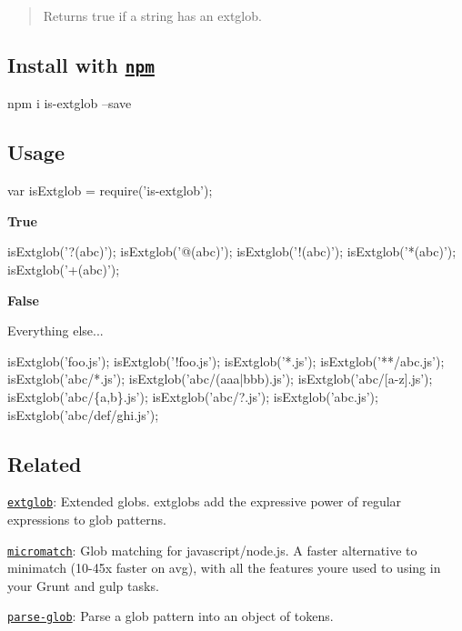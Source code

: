 \begin{quote}
Returns true if a string has an extglob. \end{quote}


\subsection*{Install with \href{npmjs.org}{\tt npm}}


\begin{DoxyCode}
npm i is-extglob --save
\end{DoxyCode}


\subsection*{Usage}


\begin{DoxyCode}
var isExtglob = require('is-extglob');
\end{DoxyCode}


{\bfseries True}


\begin{DoxyCode}
isExtglob('?(abc)');
isExtglob('@(abc)');
isExtglob('!(abc)');
isExtglob('*(abc)');
isExtglob('+(abc)');
\end{DoxyCode}


{\bfseries False}

Everything else...


\begin{DoxyCode}
isExtglob('foo.js');
isExtglob('!foo.js');
isExtglob('*.js');
isExtglob('**/abc.js');
isExtglob('abc/*.js');
isExtglob('abc/(aaa|bbb).js');
isExtglob('abc/[a-z].js');
isExtglob('abc/\{a,b\}.js');
isExtglob('abc/?.js');
isExtglob('abc.js');
isExtglob('abc/def/ghi.js');
\end{DoxyCode}


\subsection*{Related}


\begin{DoxyItemize}
\item \href{https://github.com/jonschlinkert/extglob}{\tt extglob}\+: Extended globs. extglobs add the expressive power of regular expressions to glob patterns.
\item \href{https://github.com/jonschlinkert/micromatch}{\tt micromatch}\+: Glob matching for javascript/node.\+js. A faster alternative to minimatch (10-\/45x faster on avg), with all the features you\textquotesingle{}re used to using in your Grunt and gulp tasks.
\item \href{https://github.com/jonschlinkert/parse-glob}{\tt parse-\/glob}\+: Parse a glob pattern into an object of tokens.
\end{DoxyItemize}

